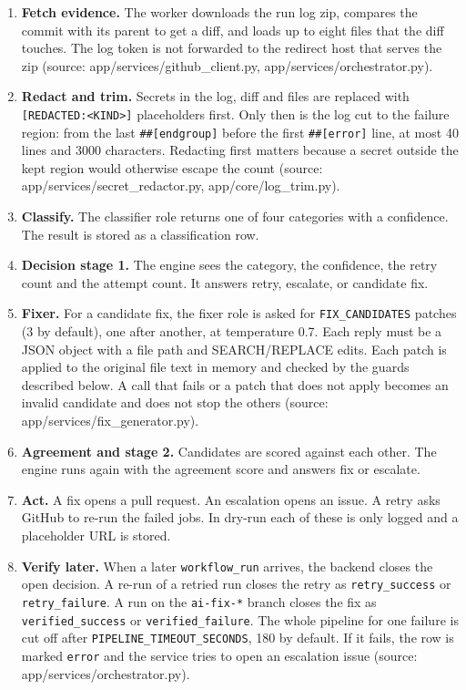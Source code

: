 \begin{enumerate}[leftmargin=*, itemsep=2pt]
\item \textbf{Fetch evidence.} The worker downloads the run log zip, compares the commit with its parent to get a diff, and loads up to eight files that the diff touches. The log token is not forwarded to the redirect host that serves the zip (source: app/\allowbreak{}services/\allowbreak{}github\_\allowbreak{}client.py, app/\allowbreak{}services/\allowbreak{}orchestrator.py).
\item \textbf{Redact and trim.} Secrets in the log, diff and files are replaced with \texttt{[REDACTED:\allowbreak{}\textless{}KIND\textgreater{}]} placeholders first. Only then is the log cut to the failure region: from the last \texttt{\#\#[endgroup]} before the first \texttt{\#\#[error]} line, at most 40 lines and 3000 characters. Redacting first matters because a secret outside the kept region would otherwise escape the count (source: app/\allowbreak{}services/\allowbreak{}secret\_\allowbreak{}redactor.py, app/\allowbreak{}core/\allowbreak{}log\_\allowbreak{}trim.py).
\item \textbf{Classify.} The classifier role returns one of four categories with a confidence. The result is stored as a classification row.
\item \textbf{Decision stage 1.} The engine sees the category, the confidence, the retry count and the attempt count. It answers retry, escalate, or candidate fix.
\item \textbf{Fixer.} For a candidate fix, the fixer role is asked for \texttt{FIX\_\allowbreak{}CANDIDATES} patches (3 by default), one after another, at temperature 0.7. Each reply must be a JSON object with a file path and SEARCH/\allowbreak{}REPLACE edits. Each patch is applied to the original file text in memory and checked by the guards described below. A call that fails or a patch that does not apply becomes an invalid candidate and does not stop the others (source: app/\allowbreak{}services/\allowbreak{}fix\_\allowbreak{}generator.py).
\item \textbf{Agreement and stage 2.} Candidates are scored against each other. The engine runs again with the agreement score and answers fix or escalate.
\item \textbf{Act.} A fix opens a pull request. An escalation opens an issue. A retry asks GitHub to re-run the failed jobs. In dry-run each of these is only logged and a placeholder URL is stored.
\item \textbf{Verify later.} When a later \texttt{workflow\_\allowbreak{}run} arrives, the backend closes the open decision. A re-run of a retried run closes the retry as \texttt{retry\_\allowbreak{}success} or \texttt{retry\_\allowbreak{}failure}. A run on the \texttt{ai-\allowbreak{}fix-\allowbreak{}*} branch closes the fix as \texttt{verified\_\allowbreak{}success} or \texttt{verified\_\allowbreak{}failure}. The whole pipeline for one failure is cut off after \texttt{PIPELINE\_\allowbreak{}TIMEOUT\_\allowbreak{}SECONDS}, 180 by default. If it fails, the row is marked \texttt{error} and the service tries to open an escalation issue (source: app/\allowbreak{}services/\allowbreak{}orchestrator.py).
\end{enumerate}


